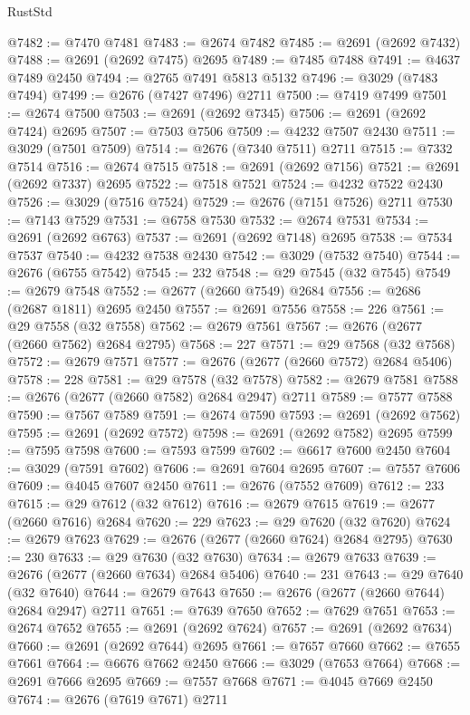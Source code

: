 \begin{lexlean}{RustStd}
\begin{coremodule}
@7482 := @7470 @7481
@7483 := @2674 @7482
@7485 := @2691 (@2692 @7432)
@7488 := @2691 (@2692 @7475) @2695
@7489 := @7485 @7488
@7491 := @4637 @7489 @2450
@7494 := @2765 @7491 @5813 @5132
@7496 := @3029 (@7483 @7494)
@7499 := @2676 (@7427 @7496) @2711
@7500 := @7419 @7499
@7501 := @2674 @7500
@7503 := @2691 (@2692 @7345)
@7506 := @2691 (@2692 @7424) @2695
@7507 := @7503 @7506
@7509 := @4232 @7507 @2430
@7511 := @3029 (@7501 @7509)
@7514 := @2676 (@7340 @7511) @2711
@7515 := @7332 @7514
@7516 := @2674 @7515
@7518 := @2691 (@2692 @7156)
@7521 := @2691 (@2692 @7337) @2695
@7522 := @7518 @7521
@7524 := @4232 @7522 @2430
@7526 := @3029 (@7516 @7524)
@7529 := @2676 (@7151 @7526) @2711
@7530 := @7143 @7529
@7531 := @6758 @7530
@7532 := @2674 @7531
@7534 := @2691 (@2692 @6763)
@7537 := @2691 (@2692 @7148) @2695
@7538 := @7534 @7537
@7540 := @4232 @7538 @2430
@7542 := @3029 (@7532 @7540)
@7544 := @2676 (@6755 @7542)
@7545 := 232
@7548 := @29 @7545 (@32 @7545)
@7549 := @2679 @7548
@7552 := @2677 (@2660 @7549) @2684
@7556 := @2686 (@2687 @1811) @2695 @2450
@7557 := @2691 @7556
@7558 := 226
@7561 := @29 @7558 (@32 @7558)
@7562 := @2679 @7561
@7567 := @2676 (@2677 (@2660 @7562) @2684 @2795)
@7568 := 227
@7571 := @29 @7568 (@32 @7568)
@7572 := @2679 @7571
@7577 := @2676 (@2677 (@2660 @7572) @2684 @5406)
@7578 := 228
@7581 := @29 @7578 (@32 @7578)
@7582 := @2679 @7581
@7588 := @2676 (@2677 (@2660 @7582) @2684 @2947) @2711
@7589 := @7577 @7588
@7590 := @7567 @7589
@7591 := @2674 @7590
@7593 := @2691 (@2692 @7562)
@7595 := @2691 (@2692 @7572)
@7598 := @2691 (@2692 @7582) @2695
@7599 := @7595 @7598
@7600 := @7593 @7599
@7602 := @6617 @7600 @2450
@7604 := @3029 (@7591 @7602)
@7606 := @2691 @7604 @2695
@7607 := @7557 @7606
@7609 := @4045 @7607 @2450
@7611 := @2676 (@7552 @7609)
@7612 := 233
@7615 := @29 @7612 (@32 @7612)
@7616 := @2679 @7615
@7619 := @2677 (@2660 @7616) @2684
@7620 := 229
@7623 := @29 @7620 (@32 @7620)
@7624 := @2679 @7623
@7629 := @2676 (@2677 (@2660 @7624) @2684 @2795)
@7630 := 230
@7633 := @29 @7630 (@32 @7630)
@7634 := @2679 @7633
@7639 := @2676 (@2677 (@2660 @7634) @2684 @5406)
@7640 := 231
@7643 := @29 @7640 (@32 @7640)
@7644 := @2679 @7643
@7650 := @2676 (@2677 (@2660 @7644) @2684 @2947) @2711
@7651 := @7639 @7650
@7652 := @7629 @7651
@7653 := @2674 @7652
@7655 := @2691 (@2692 @7624)
@7657 := @2691 (@2692 @7634)
@7660 := @2691 (@2692 @7644) @2695
@7661 := @7657 @7660
@7662 := @7655 @7661
@7664 := @6676 @7662 @2450
@7666 := @3029 (@7653 @7664)
@7668 := @2691 @7666 @2695
@7669 := @7557 @7668
@7671 := @4045 @7669 @2450
@7674 := @2676 (@7619 @7671) @2711

\end{coremodule}
\end{lexlean}
